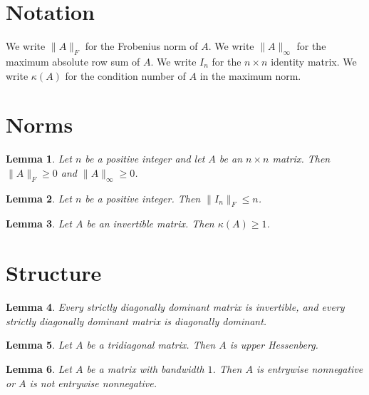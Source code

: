 \documentclass{article}
\newtheorem{lemma}{Lemma}
\begin{document}
\section{Notation}

We write $\|A\|_F$ for the Frobenius norm of $A$.
We write $\|A\|_\infty$ for the maximum absolute row sum of $A$.
We write $I_n$ for the $n\times n$ identity matrix.
We write $\kappa(A)$ for the condition number of $A$ in the maximum norm.

\section{Norms}

\begin{lemma}\label{frobenius}
Let $n$ be a positive integer and let $A$ be an $n\times n$ matrix. Then $\|A\|_F\ge0$ and $\|A\|_\infty\ge0$.
\end{lemma}

\begin{lemma}\label{identity}
Let $n$ be a positive integer. Then $\|I_n\|_F\le n$.
\end{lemma}

\begin{lemma}\label{condition}
Let $A$ be an invertible matrix. Then $\kappa(A)\ge1$.
\end{lemma}

\section{Structure}

\begin{lemma}\label{dominant}
Every strictly diagonally dominant matrix is invertible, and every strictly diagonally dominant matrix is diagonally dominant.
\end{lemma}

\begin{lemma}\label{tridiagonal}
Let $A$ be a tridiagonal matrix. Then $A$ is upper Hessenberg.
\end{lemma}

\begin{lemma}\label{band}
Let $A$ be a matrix with bandwidth $1$. Then $A$ is entrywise nonnegative or $A$ is not entrywise nonnegative.
\end{lemma}
\end{document}
